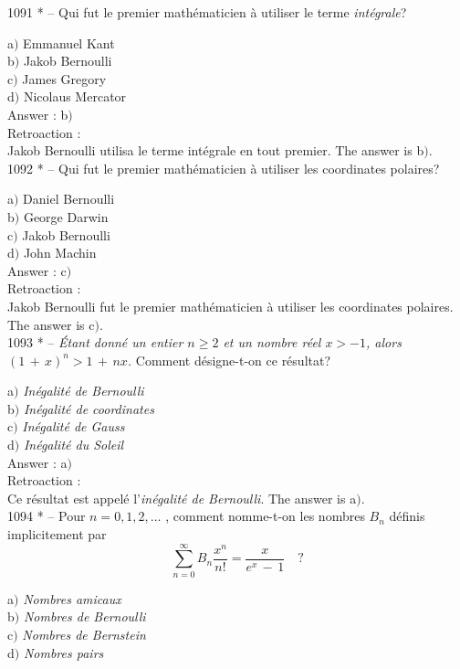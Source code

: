 ﻿\documentclass[letterpaper, 12pt]{article}
\begin{document}
1091 * -- Qui fut le premier math\'ematicien \`a utiliser le terme
{\sl int\'egrale}?

a$)$ Emmanuel Kant \\
b$)$ Jakob Bernoulli  \\
c$)$ James Gregory  \\
d$)$ Nicolaus Mercator\\

Answer : b$)$\\

Retroaction : \\
Jakob Bernoulli utilisa le terme int\'egrale en tout premier.
The answer is b$)$.\\

1092 * -- Qui fut le premier math\'ematicien \`a utiliser les
coordinates polaires?

a$)$ Daniel Bernoulli \\
b$)$ George Darwin  \\
c$)$ Jakob Bernoulli  \\
d$)$ John Machin\\

Answer : c$)$\\

Retroaction : \\
Jakob Bernoulli fut le premier math\'ematicien \`a utiliser les
coordinates polaires.
The answer is c$)$.\\

1093 * -- {\sl \'Etant donn\'e un entier $n\ge2$ et un nombre r\'eel
$x>-1$, alors $(1\,+\,x)^n>1\,+\,nx$.} Comment d\'esigne-t-on ce
r\'esultat?

a$)$ {\sl In\'egalit\'e de Bernoulli} \\
b$)$ {\sl In\'egalit\'e de coordinates}  \\
c$)$ {\sl In\'egalit\'e de Gauss}  \\
d$)$ {\sl In\'egalit\'e du Soleil}\\

Answer : a$)$\\

Retroaction : \\
Ce r\'esultat est appel\'e l'{\sl in\'egalit\'e de Bernoulli}.
The answer is a$)$.\\

1094 * -- Pour $n=0,1,2,\ldots$ , comment nomme-t-on les nombres
$B_n$ d\'efinis implicitement par
$$\displaystyle{\sum_{n=0}^{\infty}B_n\frac{x^n}{n!}=\frac
x{e^x\,-\,1}}\quad ?$$

a$)$ {\sl Nombres amicaux} \\
b$)$ {\sl Nombres de Bernoulli}  \\
c$)$ {\sl Nombres de Bernstein}  \\
d$)$ {\sl Nombres pairs}\\
\end{document}
